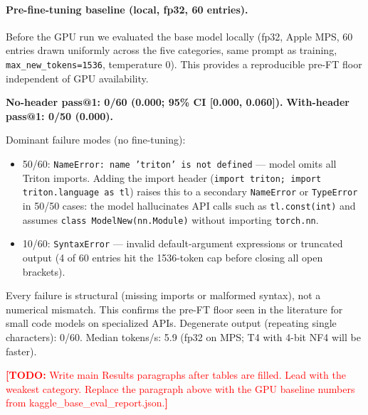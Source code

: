 \documentclass[11pt]{article}
\newcommand{\todo}[1]{\textcolor{red}{\textbf{[TODO:} #1\textbf{]}}}
\newcommand{\code}[1]{\texttt{#1}}
\begin{document}
\paragraph{Pre-fine-tuning baseline (local, fp32, 60 entries).}
Before the GPU run we evaluated the base model locally (fp32, Apple MPS, 60 entries
drawn uniformly across the five categories, same prompt as training, \code{max\_new\_tokens=1536},
temperature 0). This provides a reproducible pre-FT floor independent of GPU availability.

\textbf{No-header pass@1: 0/60 (0.000; 95\% CI [0.000, 0.060]).}
\textbf{With-header pass@1: 0/50 (0.000).}

\noindent Dominant failure modes (no fine-tuning):
\begin{itemize}
  \item 50/60: \code{NameError: name 'triton' is not defined} — model omits all Triton imports.
        Adding the import header (\code{import triton; import triton.language as tl}) raises this
        to a secondary \code{NameError} or \code{TypeError} in 50/50 cases: the model hallucinates
        API calls such as \code{tl.const(int)} and assumes \code{class ModelNew(nn.Module)} without
        importing \code{torch.nn}.
  \item 10/60: \code{SyntaxError} — invalid default-argument expressions or truncated output
        (4 of 60 entries hit the 1536-token cap before closing all open brackets).
\end{itemize}
Every failure is structural (missing imports or malformed syntax), not a numerical mismatch.
This confirms the pre-FT floor seen in the literature for small code models on specialized APIs.
Degenerate output (repeating single characters): 0/60.
Median tokens/s: 5.9 (fp32 on MPS; T4 with 4-bit NF4 will be faster).

\todo{Write main Results paragraphs after tables are filled. Lead with the weakest category. Replace
the paragraph above with the GPU baseline numbers from kaggle\_base\_eval\_report.json.}
\end{document}
